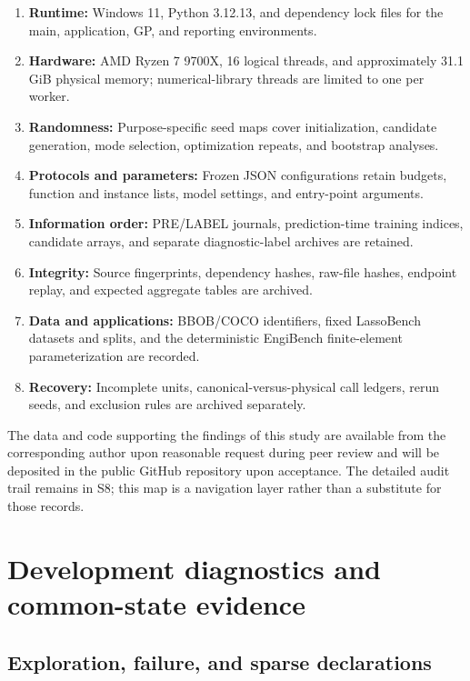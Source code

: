 \documentclass[cmc,article,submit,moreauthors,pdftex]{Definitions/tsp}
\providecommand{\tightlist}{\setlength{\itemsep}{0pt}\setlength{\parskip}{0pt}}
\begin{document}
\begin{enumerate}
\def\labelenumi{\arabic{enumi}.}
\tightlist
\item
  \textbf{Runtime:} Windows 11, Python 3.12.13, and dependency lock files for the main, application, GP, and reporting environments.
\item
  \textbf{Hardware:} AMD Ryzen 7 9700X, 16 logical threads, and approximately 31.1 GiB physical memory; numerical-library threads are limited to one per worker.
\item
  \textbf{Randomness:} Purpose-specific seed maps cover initialization, candidate generation, mode selection, optimization repeats, and bootstrap analyses.
\item
  \textbf{Protocols and parameters:} Frozen JSON configurations retain budgets, function and instance lists, model settings, and entry-point arguments.
\item
  \textbf{Information order:} PRE/LABEL journals, prediction-time training indices, candidate arrays, and separate diagnostic-label archives are retained.
\item
  \textbf{Integrity:} Source fingerprints, dependency hashes, raw-file hashes, endpoint replay, and expected aggregate tables are archived.
\item
  \textbf{Data and applications:} BBOB/COCO identifiers, fixed LassoBench datasets and splits, and the deterministic EngiBench finite-element parameterization are recorded.
\item
  \textbf{Recovery:} Incomplete units, canonical-versus-physical call ledgers, rerun seeds, and exclusion rules are archived separately.
\end{enumerate}

The data and code supporting the findings of this study are available from the corresponding author upon reasonable request during peer review and will be deposited in the public GitHub repository upon acceptance. The detailed audit trail remains in S8; this map is a navigation layer rather than a substitute for those records.

\hypertarget{development-diagnostics-and-common-state-evidence}{%
\section{Development diagnostics and common-state evidence}\label{development-diagnostics-and-common-state-evidence}}

\hypertarget{exploration-failure-and-sparse-declarations}{%
\subsection{Exploration, failure, and sparse declarations}\label{exploration-failure-and-sparse-declarations}}
\end{document}
